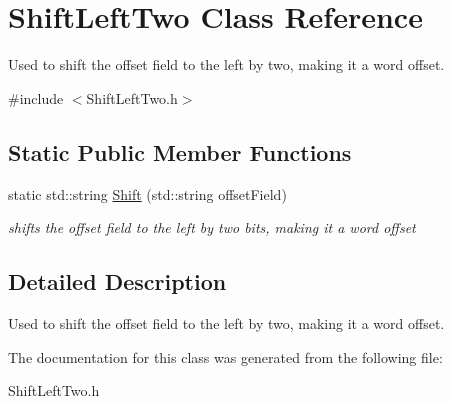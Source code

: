 \hypertarget{class_shift_left_two}{}\section{Shift\+Left\+Two Class Reference}
\label{class_shift_left_two}


Used to shift the offset field to the left by two, making it a word offset.  




{\ttfamily \#include $<$Shift\+Left\+Two.\+h$>$}

\subsection*{Static Public Member Functions}
\begin{DoxyCompactItemize}
\item 
\mbox{\label{class_shift_left_two_ac5c1981353db16983cd30c5acdee3622}} 
static std\+::string \mbox{\hyperlink{class_shift_left_two_ac5c1981353db16983cd30c5acdee3622}{Shift}} (std\+::string offset\+Field)
\begin{DoxyCompactList}\small\item\em shifts the offset field to the left by two bits, making it a word offset \end{DoxyCompactList}\end{DoxyCompactItemize}


\subsection{Detailed Description}
Used to shift the offset field to the left by two, making it a word offset. 

The documentation for this class was generated from the following file\+:\begin{DoxyCompactItemize}
\item 
Shift\+Left\+Two.\+h\end{DoxyCompactItemize}
